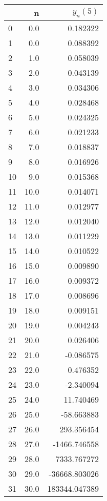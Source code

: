 \begin{tabular}{lrr}
\toprule
{} &     n &       $y_n(5)$ \\
\midrule
0  &   0.0 &       0.182322 \\
1  &   0.0 &       0.088392 \\
2  &   1.0 &       0.058039 \\
3  &   2.0 &       0.043139 \\
4  &   3.0 &       0.034306 \\
5  &   4.0 &       0.028468 \\
6  &   5.0 &       0.024325 \\
7  &   6.0 &       0.021233 \\
8  &   7.0 &       0.018837 \\
9  &   8.0 &       0.016926 \\
10 &   9.0 &       0.015368 \\
11 &  10.0 &       0.014071 \\
12 &  11.0 &       0.012977 \\
13 &  12.0 &       0.012040 \\
14 &  13.0 &       0.011229 \\
15 &  14.0 &       0.010522 \\
16 &  15.0 &       0.009890 \\
17 &  16.0 &       0.009372 \\
18 &  17.0 &       0.008696 \\
19 &  18.0 &       0.009151 \\
20 &  19.0 &       0.004243 \\
21 &  20.0 &       0.026406 \\
22 &  21.0 &      -0.086575 \\
23 &  22.0 &       0.476352 \\
24 &  23.0 &      -2.340094 \\
25 &  24.0 &      11.740469 \\
26 &  25.0 &     -58.663883 \\
27 &  26.0 &     293.356454 \\
28 &  27.0 &   -1466.746558 \\
29 &  28.0 &    7333.767272 \\
30 &  29.0 &  -36668.803026 \\
31 &  30.0 &  183344.047389 \\
\bottomrule
\end{tabular}
